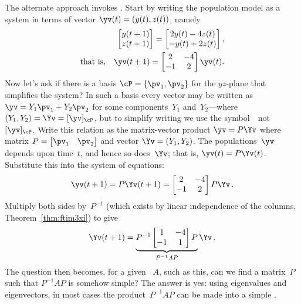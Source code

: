 The alternate approach invokes .
Start by writing the population model as a system in terms of vector \(\yv(t)=(y(t),z(t))\), namely
\begin{eqnarray*}&&
\begin{bmatrix} y(t+1)\\z(t+1) \end{bmatrix}
=\begin{bmatrix} 2y(t)-4z(t)\\-y(t)+2z(t) \end{bmatrix}
,\\\text{that is,}&&
\yv(t+1)=\begin{bmatrix} 2&-4\\-1&2 \end{bmatrix}\yv(t).
\end{eqnarray*}
Now let's ask if there is a basis \(\cP=\{\pv_1,\pv_2\}\) for the \(yz\)-plane that simplifies the system?
In such a basis every vector may be written as \(\yv=Y_1\pv_1+Y_2\pv_2\) for some components~\(Y_1\) and~\(Y_2\)---where \((Y_1,Y_2)=\Yv=[\yv]_\cP\), but to simplify writing we use the symbol~\Yv\ not~\([\yv]_\cP\).
Write this relation as the matrix-vector product \(\yv=P\Yv\) where matrix \(P=\begin{bmatrix} \pv_1&\pv_2 \end{bmatrix}\) and vector \(\Yv=(Y_1,Y_2)\).
The populations~\(\yv\) depends upon time~\(t\), and hence so does~\(\Yv\); that is, \(\yv(t)=P\Yv(t)\).
Substitute this into the system of equations:
\begin{equation*}
\yv(t+1)=P\Yv(t+1)=\begin{bmatrix} 2&-4\\-1&2 \end{bmatrix}P\Yv\,.
\end{equation*}
Multiply both sides by~\(P^{-1}\) (which exists by linear independence of the columns, Theorem~\ref{thm:ftim3xi}) to give
\begin{equation*}
\Yv(t+1)=\underbrace{P^{-1}\begin{bmatrix} 1&-4\\-1&1 \end{bmatrix}P}_{P^{-1}AP}\Yv\,.
\end{equation*}
The question then becomes, for a given ~\(A\), such as this, can we find a matrix~\(P\) such that \(P^{-1}AP\) is somehow simple?
The answer is yes: using eigenvalues and eigenvectors, in most cases the product~\(P^{-1}AP\) can be made into a simple .




